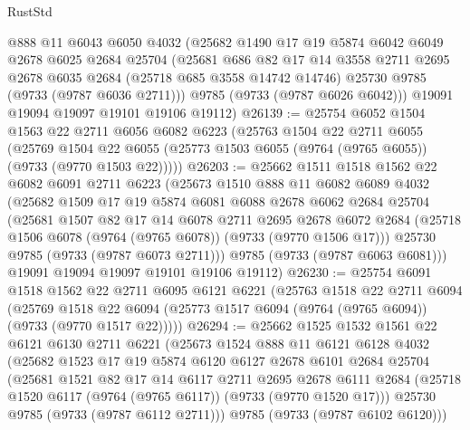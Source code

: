 \begin{lexlean}{RustStd}
\begin{coremodule}
{\begin{coremodule}
{{{{{{{{{{{{{{{{{{{{{{{{{{{{{{{{{{{{{{{{{{{{{{{{{{{{{{{      @888
      @11
      @6043
      @6050
      @4032
      (@25682
        @1490
        @17
        @19
        @5874
        @6042
        @6049
        @2678
        @6025
        @2684
        @25704
        (@25681
          @686
          @82
          @17
          @14
          @3558
          @2711
          @2695
          @2678
          @6035
          @2684
          (@25718 @685 @3558 @14742 @14746)
          @25730
          @9785
          (@9733 (@9787 @6036 @2711)))
        @9785
        (@9733 (@9787 @6026 @6042)))
      @19091
      @19094
      @19097
      @19101
      @19106
      @19112)
@26139 := @25754
    @6052
    @1504
    @1563
    @22
    @2711
    @6056
    @6082
    @6223
    (@25763
      @1504
      @22
      @2711
      @6055
      (@25769 @1504 @22 @6055 (@25773 @1503 @6055 (@9764 (@9765 @6055)) (@9733 (@9770 @1503 @22)))))
@26203 := @25662
    @1511
    @1518
    @1562
    @22
    @6082
    @6091
    @2711
    @6223
    (@25673
      @1510
      @888
      @11
      @6082
      @6089
      @4032
      (@25682
        @1509
        @17
        @19
        @5874
        @6081
        @6088
        @2678
        @6062
        @2684
        @25704
        (@25681
          @1507
          @82
          @17
          @14
          @6078
          @2711
          @2695
          @2678
          @6072
          @2684
          (@25718 @1506 @6078 (@9764 (@9765 @6078)) (@9733 (@9770 @1506 @17)))
          @25730
          @9785
          (@9733 (@9787 @6073 @2711)))
        @9785
        (@9733 (@9787 @6063 @6081)))
      @19091
      @19094
      @19097
      @19101
      @19106
      @19112)
@26230 := @25754
    @6091
    @1518
    @1562
    @22
    @2711
    @6095
    @6121
    @6221
    (@25763
      @1518
      @22
      @2711
      @6094
      (@25769 @1518 @22 @6094 (@25773 @1517 @6094 (@9764 (@9765 @6094)) (@9733 (@9770 @1517 @22)))))
@26294 := @25662
    @1525
    @1532
    @1561
    @22
    @6121
    @6130
    @2711
    @6221
    (@25673
      @1524
      @888
      @11
      @6121
      @6128
      @4032
      (@25682
        @1523
        @17
        @19
        @5874
        @6120
        @6127
        @2678
        @6101
        @2684
        @25704
        (@25681
          @1521
          @82
          @17
          @14
          @6117
          @2711
          @2695
          @2678
          @6111
          @2684
          (@25718 @1520 @6117 (@9764 (@9765 @6117)) (@9733 (@9770 @1520 @17)))
          @25730
          @9785
          (@9733 (@9787 @6112 @2711)))
        @9785
        (@9733 (@9787 @6102 @6120)))
}}}}}}}}}}}}}}}}}}}}}}}}}}}}}}}}}}}}}}}}}}}}}}}}}}}}}}}
\end{coremodule}}
\end{coremodule}
\end{lexlean}

